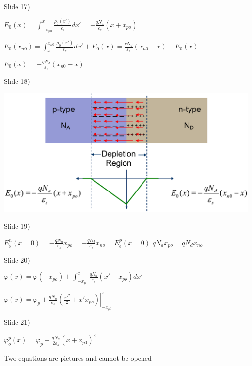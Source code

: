\documentclass{beamer}
\begin{document}
 \begin{frame}{Slide 17)}

 ${E_0}(x) = \int_{ - {x_{p0}}}^x {\frac{{{\rho _0}(x')}}{{{\varepsilon _s}}}dx'}  =  - \frac{{q{N_a}}}{{{\varepsilon _s}}}(x + {x_{po}})$

 ${E_0}({x_{n0}}) = \int_x^{{x_{n0}}} {\frac{{{\rho _0}(x')}}{{{\varepsilon _s}}}dx'}  + {E_0}(x) = \frac{{q{N_d}}}{{{\varepsilon _s}}}({x_{n0}} - x) + {E_0}(x)$

 ${E_0}(x) =  - \frac{{q{N_d}}}{{{\varepsilon _s}}}({x_{n0}} - x)$
 \end{frame}


\begin{frame}{Slide 18)}

\includegraphics[width=.6\columnwidth]{slide18}
 \end{frame}

 \begin{frame}{Slide 19)}


 $E_{_0}^n(x = 0) =  - \frac{{q{N_a}}}{{{\varepsilon _s}}}{x_{po}} =  - \frac{{q{N_d}}}{{{\varepsilon _s}}}{x_{no}} = E_{_0}^p(x = 0)$
 $q{N_a}{x_{po}} = q{N_d}{x_{no}}$

 \end{frame}

 \begin{frame}{Slide 20)}

 $\varphi (x) = \varphi ( - {x_{po}}) + \int_{ - {x_{p0}}}^x {\frac{{q{N_a}}}{{{\varepsilon _s}}}(x' + {x_{po}})dx'} $

 $\varphi (x) = {\varphi _p} + \left. {\frac{{q{N_a}}}{{{\varepsilon _s}}}\left( {\frac{{x{'^2}}}{2} + x'{x_{po}}} \right)} \right|_{ - {x_{p0}}}^x$
 \end{frame}

 \begin{frame}{Slide 21)}

 $\varphi _o^p(x) = {\varphi _p} + \frac{{q{N_a}}}{{2{\varepsilon _s}}}{(x + {x_{p0}})^2}$

 Two equations are pictures and cannot be opened
 \end{frame}
\end{document}
